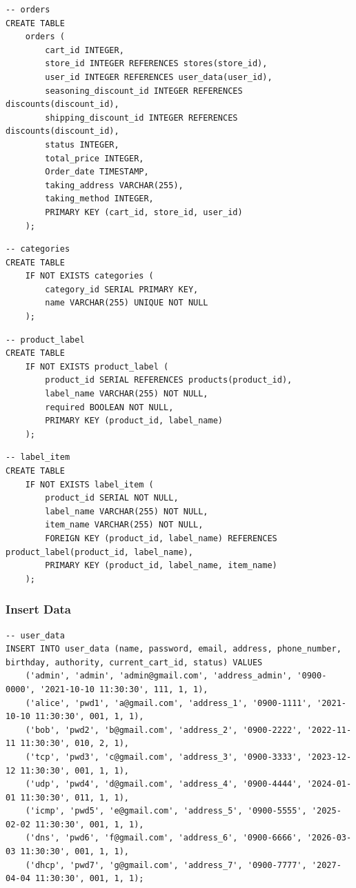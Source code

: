\documentclass[a4paper, 12pt]{article}
\begin{document}
\begin{lstlisting}
-- orders
CREATE TABLE
    orders (
        cart_id INTEGER,
        store_id INTEGER REFERENCES stores(store_id),
        user_id INTEGER REFERENCES user_data(user_id),
        seasoning_discount_id INTEGER REFERENCES discounts(discount_id),
        shipping_discount_id INTEGER REFERENCES discounts(discount_id),
        status INTEGER,
        total_price INTEGER,
        Order_date TIMESTAMP,
        taking_address VARCHAR(255),
        taking_method INTEGER,
        PRIMARY KEY (cart_id, store_id, user_id)
    );
\end{lstlisting}

\begin{lstlisting}
-- categories
CREATE TABLE
    IF NOT EXISTS categories (
        category_id SERIAL PRIMARY KEY,
        name VARCHAR(255) UNIQUE NOT NULL
    );
\end{lstlisting}

\begin{lstlisting}
-- product_label
CREATE TABLE
    IF NOT EXISTS product_label (
        product_id SERIAL REFERENCES products(product_id),
        label_name VARCHAR(255) NOT NULL,
        required BOOLEAN NOT NULL,
        PRIMARY KEY (product_id, label_name)
    );
\end{lstlisting}

\begin{lstlisting}
-- label_item
CREATE TABLE
    IF NOT EXISTS label_item (
        product_id SERIAL NOT NULL,
        label_name VARCHAR(255) NOT NULL,
        item_name VARCHAR(255) NOT NULL,
        FOREIGN KEY (product_id, label_name) REFERENCES product_label(product_id, label_name),
        PRIMARY KEY (product_id, label_name, item_name)
    );
\end{lstlisting}

\subsubsection{Insert Data}

\begin{lstlisting}
-- user_data
INSERT INTO user_data (name, password, email, address, phone_number, birthday, authority, current_cart_id, status) VALUES
    ('admin', 'admin', 'admin@gmail.com', 'address_admin', '0900-0000', '2021-10-10 11:30:30', 111, 1, 1),
    ('alice', 'pwd1', 'a@gmail.com', 'address_1', '0900-1111', '2021-10-10 11:30:30', 001, 1, 1),
    ('bob', 'pwd2', 'b@gmail.com', 'address_2', '0900-2222', '2022-11-11 11:30:30', 010, 2, 1),
    ('tcp', 'pwd3', 'c@gmail.com', 'address_3', '0900-3333', '2023-12-12 11:30:30', 001, 1, 1),
    ('udp', 'pwd4', 'd@gmail.com', 'address_4', '0900-4444', '2024-01-01 11:30:30', 011, 1, 1),
    ('icmp', 'pwd5', 'e@gmail.com', 'address_5', '0900-5555', '2025-02-02 11:30:30', 001, 1, 1),
    ('dns', 'pwd6', 'f@gmail.com', 'address_6', '0900-6666', '2026-03-03 11:30:30', 001, 1, 1),
    ('dhcp', 'pwd7', 'g@gmail.com', 'address_7', '0900-7777', '2027-04-04 11:30:30', 001, 1, 1);
\end{lstlisting}
\end{document}
